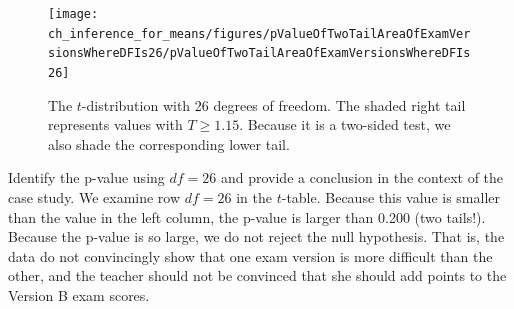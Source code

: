 \begin{figure}[h]
\centering
\texttt{[image: ch\_inference\_for\_means/figures/pValueOfTwoTailAreaOfExamVersionsWhereDFIs26/pValueOfTwoTailAreaOfExamVersionsWhereDFIs26]}
\caption{The $t$-distribution with 26 degrees of freedom. The shaded right tail represents values with $T \geq 1.15$. Because it is a two-sided test, we also shade the corresponding lower tail.}
\label{pValueOfTwoTailAreaOfExamVersionsWhereDFIs26}
\end{figure}

\begin{examplewrap}
\begin{nexample}{Identify the p-value using $df = 26$ and provide a conclusion in the context of the case study.}
We examine row $df=26$ in the $t$-table. Because this value is smaller than the value in the left column, the p-value is larger than 0.200 (two tails!). Because the p-value is so large, we do not reject the null hypothesis. That is, the data do not convincingly show that one exam version is more difficult than the other, and the teacher should not be convinced that she should add points to the Version B exam scores.

\end{nexample}
\end{examplewrap}


